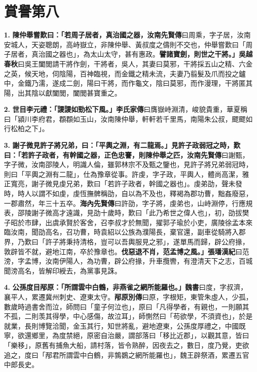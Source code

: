 \chapter{賞譽第八}

\textbf{1.} \textbf{陳仲舉嘗歎曰：「若周子居者，真治國之器，}{\footnotesize \textbf{汝南先賢傳}曰周乘，字子居，汝南安城人，天姿聰朗，高峙嶽立，非陳仲舉、黃叔度之儔則不交也，仲舉嘗歎曰「周子居者，真治國之器也」，為太山太守，甚有惠政。}\textbf{譬諸寶劍，則世之干將。」}{\footnotesize \textbf{吳越春秋}曰吳王闔閭請干將作劍，干將者，吳人，其妻曰莫邪，干將採五山之精、六金之英，候天地，伺陰陽，百神臨視，而金鐵之精未流，夫妻乃翦髮及爪而投之鑪中，金鐵乃濡，遂成二劍，陽曰干將，而作龜文，陰曰莫邪，而作漫理，干將匿其陽，出其陰以獻闔閭，闔閭甚寶重之。}

\textbf{2.} \textbf{世目李元禮：「謖謖如勁松下風。」}{\footnotesize \textbf{李氏家傳}曰膺嶽峙淵清，峻貌貴重，華夏稱曰「潁川李府君，頵頵如玉山，汝南陳仲舉，軒軒若千里馬，南陽朱公叔，飂飂如行松柏之下」。}

\textbf{3.} \textbf{謝子微見許子將兄弟，曰：「平輿之淵，有二龍焉。」見許子政弱冠之時，歎曰：「若許子政者，有幹國之器，正色忠謇，則陳仲舉之匹，}{\footnotesize \textbf{汝南先賢傳}曰謝甄，字子微，汝南邵陵人，明識人倫，雖郭林宗不及甄之鑒也，見許子將兄弟弱冠時，則曰「平輿之淵有二龍」，仕為豫章從事。許虔，字子政，平輿人，體尚高潔，雅正寬亮，謝子微見虔兄弟，歎曰「若許子政者，幹國之器也」。虔弟劭，聲未發時，時人以謂不如虔，虔恆撫髀稱劭，自以為不及也，釋褐為郡功曹，黜姦廢惡，一郡肅然，年三十五卒。\textbf{海內先賢傳}曰許劭，字子將，虔弟也，山峙淵停，行應規表，邵陵謝子微高才遠識，見劭十歲時，歎曰「此乃希世之偉人也」，初，劭拔樊子昭於市肆，出虞承賢於客舍，召李叔才於無聞，擢郭子瑜於小吏，廣陵徐孟本來臨汝南，聞劭高名，召功曹，時袁紹以公族為濮陽長，棄官還，副車從騎將入郡界，乃歎曰「許子將秉持清格，豈可以吾輿服見之邪」，遂單馬而歸，辟公府掾，敦辟皆不就，避地江南，卒於豫章也。}\textbf{伐惡退不肖，范孟博之風。」}{\footnotesize \textbf{張璠漢紀}曰范滂，字孟博，汝南伊陽人，為功曹，辟公府掾，升車攬轡，有澄清天下之志，百城聞滂高名，皆解印綬去，為黨事見誅。}

\textbf{4.} \textbf{公孫度目邴原：「所謂雲中白鶴，非燕雀之網所能羅也。」}{\footnotesize \textbf{魏書}曰度，字叔濟，襄平人，累遷冀州刺史、遼東太守。\textbf{邴原別傳}曰原，字根矩，東管朱虛人，少孤，數歲時過書舍而泣，師問曰「童子何泣也」，原曰「凡得學者，有親也，一則願其不孤，二則羡其得學，中心感傷，故泣耳」，師惻然曰「苟欲學，不須資也」，於是就業，長則博覽洽聞，金玉其行，知世將亂，避地遼東，公孫度厚禮之，中國既寧，欲還鄉里，為度禁絕，原密自治嚴，謂部落曰「移比近郡」，以觀其意，皆曰「樂移」，原舊有捕魚大船，請村落，皆令熟醉，因夜去之，數日，度乃覺，吏欲追之，度曰「邴君所謂雲中白鶴，非鶉鷃之網所能羅也」，魏王辟祭酒，累遷五官中郎長史。}


